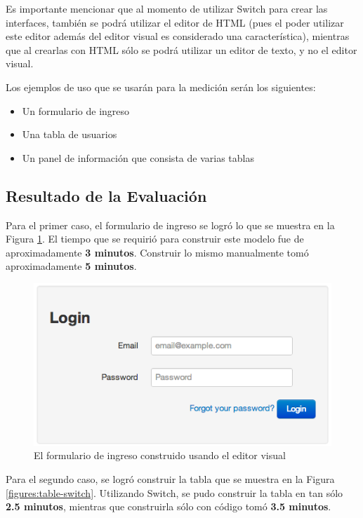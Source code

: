 \documentclass[12pt,titlepage,]{article}
\makeatletter
\def\maxwidth{\ifdim\Gin@nat@width>\linewidth\linewidth
\else\Gin@nat@width\fi}
\let\Oldincludegraphics\includegraphics
\renewcommand{\includegraphics}[1]{\Oldincludegraphics[width=\maxwidth]{#1}}
\makeatother
\begin{document}
Es importante mencionar que al momento de utilizar Switch para crear las
interfaces, también se podrá utilizar el editor de HTML (pues el poder
utilizar este editor además del editor visual es considerado una
característica), mientras que al crearlas con HTML sólo se podrá
utilizar un editor de texto, y no el editor visual.

Los ejemplos de uso que se usarán para la medición serán los siguientes:

\begin{itemize}
\item
  Un formulario de ingreso
\item
  Una tabla de usuarios
\item
  Un panel de información que consista de varias tablas
\end{itemize}

\subsection{Resultado de la Evaluación}

Para el primer caso, el formulario de ingreso se logró lo que se muestra
en la Figura \ref{figures:login-form}. El tiempo que se requirió para
construir este modelo fue de aproximadamente \textbf{3 minutos}.
Construir lo mismo manualmente tomó aproximadamente \textbf{5 minutos}.

\begin{figure}[htbp]
\centering
\includegraphics{figures/login-form-switch.png}
\caption{El formulario de ingreso construido usando el editor visual
\label{figures:login-form}}
\end{figure}

Para el segundo caso, se logró construir la tabla que se muestra en la
Figura \ref{figures:table-switch}. Utilizando Switch, se pudo construir
la tabla en tan sólo \textbf{2.5 minutos}, mientras que construirla sólo
con código tomó \textbf{3.5 minutos}.
\end{document}
